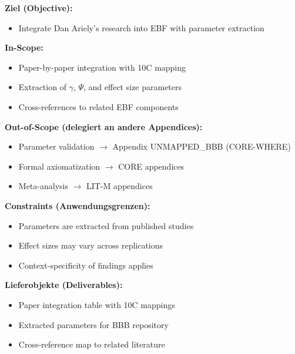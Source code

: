 
\begin{tcolorbox}[
    colback=orange!5!white,
    colframe=orange!75!black,
    title={\textbf{Appendix Scope: Ziel / In-Scope / Out-of-Scope / Constraints}},
    fonttitle=\bfseries
]

\textbf{Ziel (Objective):}
\begin{itemize}[nosep]
    \item Integrate Dan Ariely's research into EBF with parameter extraction
\end{itemize}

\textbf{In-Scope:}
\begin{itemize}[nosep]
    \item Paper-by-paper integration with 10C mapping
    \item Extraction of $\gamma$, $\Psi$, and effect size parameters
    \item Cross-references to related EBF components
\end{itemize}

\textbf{Out-of-Scope (delegiert an andere Appendices):}
\begin{itemize}[nosep]
    \item Parameter validation $\rightarrow$ Appendix UNMAPPED_BBB (CORE-WHERE)
    \item Formal axiomatization $\rightarrow$ CORE appendices
    \item Meta-analysis $\rightarrow$ LIT-M appendices
\end{itemize}

\textbf{Constraints (Anwendungsgrenzen):}
\begin{itemize}[nosep]
    \item Parameters are extracted from published studies
    \item Effect sizes may vary across replications
    \item Context-specificity of findings applies
\end{itemize}

\textbf{Lieferobjekte (Deliverables):}
\begin{itemize}[nosep]
    \item Paper integration table with 10C mappings
    \item Extracted parameters for BBB repository
    \item Cross-reference map to related literature
\end{itemize}

\end{tcolorbox}

